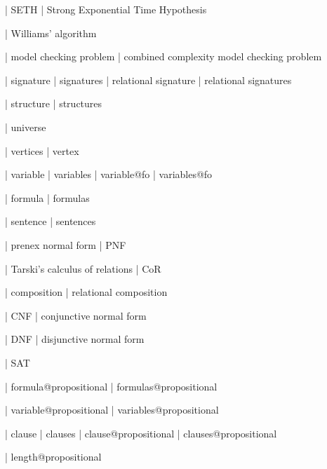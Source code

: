 | SETH
| Strong Exponential Time Hypothesis

| Williams' algorithm

%
%
| model checking problem
| combined complexity model checking problem

| signature
| signatures
| relational signature
| relational signatures

| structure
| structures

| universe

| vertices
| vertex

| variable
| variables
| variable@fo
| variables@fo

| formula
| formulas

| sentence
| sentences

| prenex normal form
| PNF

%
% 
| Tarski's calculus of relations
| CoR

| composition
| relational composition

%
%
| CNF
| conjunctive normal form

| DNF
| disjunctive normal form

| SAT

 | formula@propositional
 | formulas@propositional

 | variable@propositional
 | variables@propositional

 | clause
 | clauses
 | clause@propositional
 | clauses@propositional

 | length@propositional
